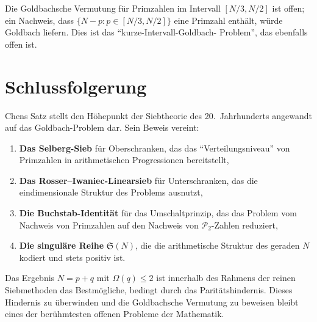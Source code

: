 \documentclass[12pt,a4paper]{amsart}
\theoremstyle{definition}
\newcommand{\Ptwo}{\mathcal{P}_2}
\newcommand{\OOmega}{\Omega}
\begin{document}
Die Goldbachsche Vermutung für Primzahlen im Intervall $[N/3, N/2]$ ist
offen; ein Nachweis, dass $\{N - p : p \in [N/3, N/2]\}$ eine Primzahl
enthält, würde Goldbach liefern.  Dies ist das ``kurze-Intervall-Goldbach-
Problem'', das ebenfalls offen ist.

\section{Schlussfolgerung}

Chens Satz stellt den Höhepunkt der Siebtheorie des 20.~Jahrhunderts
angewandt auf das Goldbach-Problem dar.  Sein Beweis vereint:
\begin{enumerate}
  \item \textbf{Das Selberg-Sieb} für Oberschranken, das das ``Verteilungsniveau''
    von Primzahlen in arithmetischen Progressionen bereitstellt,
  \item \textbf{Das Rosser--Iwaniec-Linearsieb} für Unterschranken,
    das die eindimensionale Struktur des Problems ausnutzt,
  \item \textbf{Die Buchstab-Identität} für das Umschaltprinzip, das das
    Problem vom Nachweis von Primzahlen auf den Nachweis von $\Ptwo$-Zahlen
    reduziert,
  \item \textbf{Die singuläre Reihe} $\mathfrak{S}(N)$, die die arithmetische
    Struktur des geraden $N$ kodiert und stets positiv ist.
\end{enumerate}

Das Ergebnis $N = p + q$ mit $\OOmega(q) \leq 2$ ist innerhalb des Rahmens
der reinen Siebmethoden das Bestmögliche, bedingt durch das Paritätshindernis.
Dieses Hindernis zu überwinden und die Goldbachsche Vermutung zu beweisen
bleibt eines der berühmtesten offenen Probleme der Mathematik.
\end{document}
